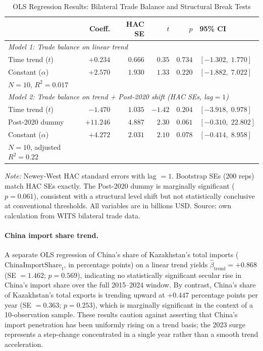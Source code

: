 \documentclass[12pt]{article}
\begin{document}
\begin{table}[H]
\centering
\small
\caption{OLS Regression Results: Bilateral Trade Balance and Structural Break Tests}
\label{tab:ols_results}
\begin{tabular}{lrrrrl}
\toprule
 & Coeff. & HAC SE & $t$ & $p$ & 95\% CI \\
\midrule
\multicolumn{6}{l}{\textit{Model 1: Trade balance on linear trend}} \\
\quad Time trend ($t$) & $+0.234$ & $0.666$ & $0.35$ & $0.734$ & $[-1.302,\; 1.770]$ \\
\quad Constant ($\alpha$) & $+2.570$ & $1.930$ & $1.33$ & $0.220$ & $[-1.882,\; 7.022]$ \\
\quad $N = 10$, $R^2 = 0.017$ & & & & & \\[6pt]
\multicolumn{6}{l}{\textit{Model 2: Trade balance on trend + Post-2020 shift (HAC SEs, lag$=1$)}} \\
\quad Time trend ($t$) & $-1.470$ & $1.035$ & $-1.42$ & $0.204$ & $[-3.918,\; 0.978]$ \\
\quad Post-2020 dummy & $+11.246$ & $4.887$ & $2.30$ & $0.061$ & $[-0.310,\; 22.802]$ \\
\quad Constant ($\alpha$) & $+4.272$ & $2.031$ & $2.10$ & $0.078$ & $[-0.414,\; 8.958]$ \\
\quad $N = 10$, adjusted $R^2 = 0.22$ & & & & & \\
\bottomrule
\end{tabular}
\footnotesize

\emph{Note:} Newey-West HAC standard errors with lag $= 1$. Bootstrap SEs (200 reps) match HAC SEs exactly. The Post-2020 dummy is marginally significant ($p = 0.061$), consistent with a structural level shift but not statistically conclusive at conventional thresholds. All variables are in billions USD. Source: own calculation from WITS bilateral trade data.
\end{table}

\paragraph{China import share trend.} A separate OLS regression of China's share of Kazakhstan's total imports ($\text{ChinaImportShare}_t$, in percentage points) on a linear trend yields $\hat{\beta}_{\text{trend}} = +0.868$ (SE $= 1.462$; $p = 0.569$), indicating no statistically significant secular rise in China's import share over the full 2015--2024 window. By contrast, China's share of Kazakhstan's total exports is trending upward at $+0.447$ percentage points per year (SE $= 0.363$; $p = 0.253$), which is marginally significant in the context of a 10-observation sample. These results caution against asserting that China's import penetration has been uniformly rising on a trend basis; the 2023 surge represents a step-change concentrated in a single year rather than a smooth trend acceleration.
\end{document}
